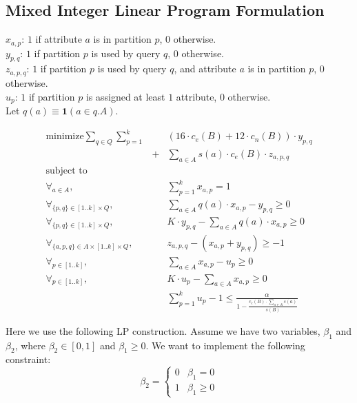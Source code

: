 \documentclass[twocolumn]{svjour3}          %
\begin{document}
\subsection{Mixed Integer Linear Program Formulation}
$x_{a,p}$: $1$ if attribute $a$ is in partition $p$, $0$ otherwise.\\
$y_{p,q}$: $1$ if partition $p$ is used by query $q$, $0$ otherwise.\\
$z_{a,p,q}$: $1$ if partition $p$ is used by query $q$, and attribute $a$ is in partition $p$, $0$ otherwise.\\
$u_{p}$: $1$ if partition $p$ is assigned at least $1$ attribute, $0$ otherwise.\\

Let $q(a)\equiv \mathbf{1}(a \in q.A)$.

\begin{eqnarray}
\text{minimize}  
    \sum_{q\in Q} \sum_{p=1}^{k} && (16\cdot c_e(B) + 12\cdot c_n(B))\cdot y_{p,q}\nonumber\\
    &+& \sum_{a\in A} s(a)\cdot c_e(B)\cdot z_{a,p,q} \nonumber\\
\text{subject to}&&\nonumber\\
\forall_{a\in A}, 
    && \sum_{p=1}^{k} x_{a,p} = 1\nonumber\\
\forall_{\{p,q\}\in [1..k]\times Q}, 
    &&  \sum_{a\in A} q(a)\cdot x_{a,p} - y_{p,q} \geq 0 \nonumber\\
\forall_{\{p,q\}\in [1..k]\times Q}, 
    &&  K\cdot y_{p,q} - \sum_{a\in A} q(a)\cdot x_{a,p}  \geq 0 \nonumber\\
\forall_{\{a,p,q\}\in A\times [1..k]\times Q},
    && z_{a,p,q} - (x_{a,p} + y_{p,q}) \geq -1\nonumber\\
\forall_{p\in[1..k]},
    && \sum_{a\in A} x_{a,p} - u_p \geq 0 \nonumber\\
\forall_{p\in[1..k]},
    && K\cdot u_p - \sum_{a\in A} x_{a,p} \geq 0 \nonumber\\    
 && \sum_{p=1}^{k} u_p -1 \leq \frac{\alpha}{
1-\frac{c_e(B)\cdot \sum_{a\in A} s(a)}{s(B)}
 } \nonumber
\end{eqnarray}

Here we use the following LP construction. Assume we have two variables,
$\beta_1$ and $\beta_2$, where $\beta_2\in[0,1]$ and $\beta_1\geq 0$. We want to
implement the following constraint: 
$$
\beta_2 = 
\begin{cases}
0 & \beta_1 = 0 \\
1 & \beta_1 \geq 0 
\end{cases}
$$ 
\end{document}

